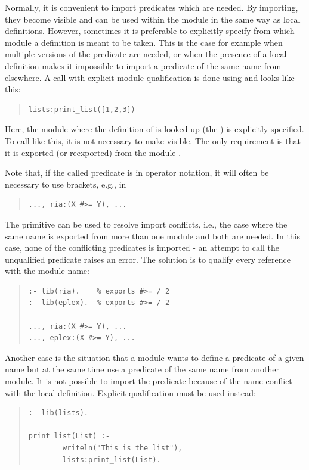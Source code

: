 Normally, it is convenient to import predicates which are needed.
By importing, they become
visible
and can be used within
the module in the same way as local definitions.
However, sometimes it is preferable to explicitly specify from
which module a definition is meant to be taken. This is the case for
example when multiple versions of the predicate are needed,
or when the presence of a local definition makes it impossible
to import a predicate of the same name from elsewhere.
A call with explicit module qualification is done using
and looks like this:
\begin{quote}
\begin{verbatim}
lists:print_list([1,2,3])
\end{verbatim}
\end{quote}
Here, the module where the definition of  is looked up
(the ) is explicitly specified. To call
like this, it is not necessary to make  visible.
The only requirement is that it is exported (or reexported) from
the module .

Note that, if the called predicate is in operator notation, it will
often be necessary to use brackets, e.g., in
\begin{quote}
\begin{verbatim}
..., ria:(X #>= Y), ...
\end{verbatim}
\end{quote}

The  primitive can be used to
resolve import conflicts,
i.e., the case where the same name is exported from more than one
module and both are needed. In this case, none of the conflicting
predicates is imported - an attempt to call the unqualified predicate
raises an error.
The solution is to qualify every reference with the module name:
\begin{quote}
\begin{verbatim}
:- lib(ria).    % exports #>= / 2
:- lib(eplex).  % exports #>= / 2

..., ria:(X #>= Y), ...
..., eplex:(X #>= Y), ...
\end{verbatim}
\end{quote}

Another case is the situation that a module wants to define a
predicate of a given name but at the same time use a predicate
of the same name from another module. It is not possible to
import the predicate because of the name conflict with the local
definition. Explicit qualification must be used instead:
\begin{quote}
\begin{verbatim}
:- lib(lists).

print_list(List) :-
        writeln("This is the list"),
        lists:print_list(List).
\end{verbatim}
\end{quote}


